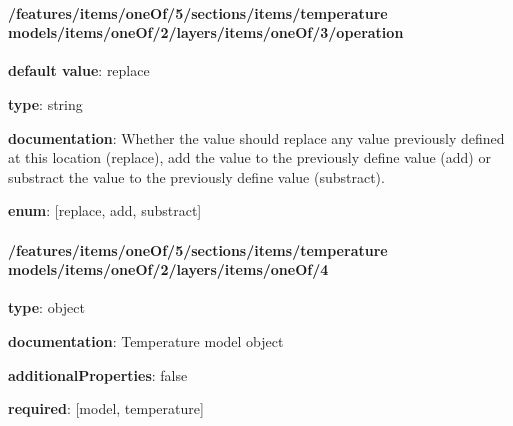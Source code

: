 \begin{itemized}
\end{itemized}\paragraph{/features/items/oneOf/5/sections/items/temperature models/items/oneOf/2/layers/items/oneOf/3/operation} \begin{itemized}
\item {\bf default value}: replace
\item {\bf type}: string
\item {\bf documentation}: Whether the value should replace any value previously defined at this location (replace), add the value to the previously define value (add) or substract the value to the previously define value (substract).
\item {\bf enum}: [replace, add, substract]\end{itemized}\paragraph{/features/items/oneOf/5/sections/items/temperature models/items/oneOf/2/layers/items/oneOf/4} \begin{itemized}
\item {\bf type}: object
\item {\bf documentation}: Temperature model object
\item {\bf additionalProperties}: false
\item {\bf required}: [model, temperature]\end{itemized}
